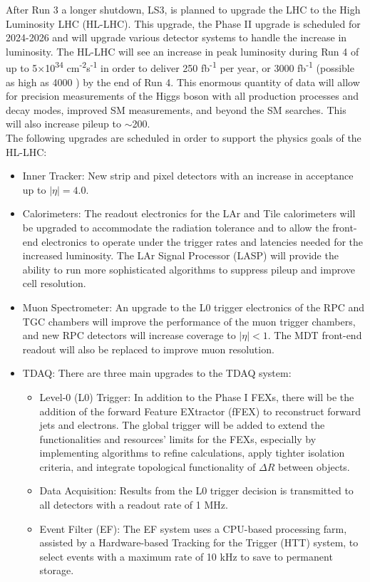 After Run 3 a longer shutdown, LS3, is planned to upgrade the LHC to the High Luminosity LHC (HL-LHC)\cite{Collaboration:2296879}.  This upgrade, the Phase II upgrade is scheduled for 2024-2026 and will upgrade various detector systems to handle the increase in luminosity.  The HL-LHC will see an increase in peak luminosity during Run 4 of up to 5$\times$10\textsuperscript{34} cm\textsuperscript{-2}s\textsuperscript{-1} in order to deliver 250 fb\textsuperscript{-1} per year, or 3000 fb\textsuperscript{-1} (possible as high as 4000 \ifb) by the end of Run 4.  This enormous quantity of data will allow for precision measurements of the Higgs boson with all production processes and decay modes, improved SM measurements, and beyond the SM searches. This will also increase pileup to $\sim$200.  \\ %

The following upgrades are scheduled in order to support the physics goals of the HL-LHC: %
\begin{itemize}
	\item Inner Tracker: New strip and pixel detectors with an increase in acceptance up to $|\eta| = 4.0$. 
	\item Calorimeters: The readout electronics for the LAr and Tile calorimeters will be upgraded to accommodate the radiation tolerance and to allow the front-end electronics to operate under the trigger rates and latencies needed for the increased luminosity.  The LAr Signal Processor (LASP) will provide the ability to run more sophisticated algorithms to suppress pileup and improve cell resolution.  
	\item Muon Spectrometer: An upgrade to the L0 trigger electronics of the RPC and TGC chambers will improve the performance of the muon trigger chambers, and new RPC detectors will increase coverage to $|\eta|<1$.  The MDT front-end readout will also be replaced to improve muon resolution.  %
	\item TDAQ: There are three main upgrades to the TDAQ system:
	\begin{itemize}
		\item Level-0 (L0) Trigger: In addition to the Phase I FEXs, there will be the addition of the forward Feature EXtractor (fFEX) to reconstruct forward jets and electrons.  The global trigger will be added to extend the functionalities and resources' limits for the FEXs, especially by implementing algorithms to refine calculations, apply tighter isolation criteria, and integrate topological functionality of $\Delta R$ between objects.  
		\item Data Acquisition: Results from the L0 trigger decision is transmitted to all detectors with a readout rate of 1 MHz.  
		\item Event Filter (EF): The EF system uses a CPU-based processing farm, assisted by a Hardware-based Tracking for the Trigger (HTT) system, to select events with a maximum rate of 10 kHz to save to permanent storage.
	\end{itemize}
\end{itemize}

